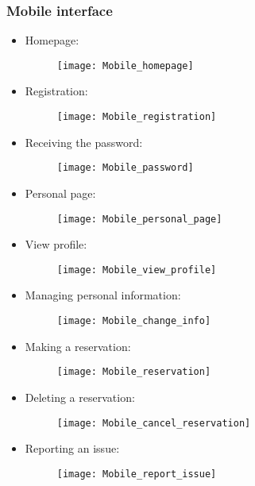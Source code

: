 \subsubsection{Mobile interface} 
\begin{itemize}
	\item Homepage:
	\begin{figure}[H]
		\centering
		\texttt{[image: Mobile\_homepage]}
	\end{figure}
\newpage
\item Registration:
\begin{figure}[H]
	\centering
	\texttt{[image: Mobile\_registration]}
\end{figure}
\newpage
\item Receiving the password:
\begin{figure}[H]
	\centering
	\texttt{[image: Mobile\_password]}
\end{figure}
\newpage
\item Personal page:
\begin{figure}[H]
	\centering
	\texttt{[image: Mobile\_personal\_page]}
\end{figure}
\newpage
\item View profile:
\begin{figure}[H]
	\centering
	\texttt{[image: Mobile\_view\_profile]}
\end{figure}
\newpage
\item Managing personal information:
\begin{figure}[H]
	\centering
	\texttt{[image: Mobile\_change\_info]}
\end{figure}
\newpage
\item Making a reservation:
\begin{figure}[H]
	\centering
	\texttt{[image: Mobile\_reservation]}
\end{figure}
\newpage
\item Deleting a reservation:
\begin{figure}[H]
	\centering
	\texttt{[image: Mobile\_cancel\_reservation]}
\end{figure}
\newpage
\item Reporting an issue:
\begin{figure}[H]
	\centering
	\texttt{[image: Mobile\_report\_issue]}
\end{figure}
\end{itemize}
\newpage
